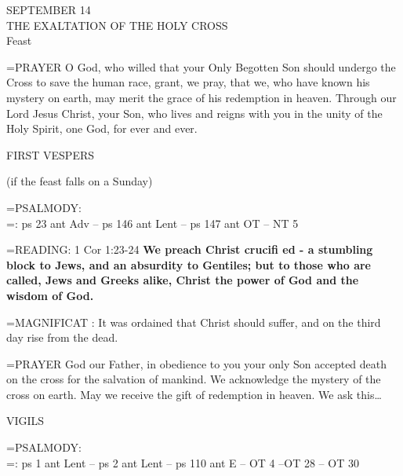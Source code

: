 \begin{center}\normalsize SEPTEMBER 14\\
\footnotesize THE EXALTATION OF THE HOLY CROSS\\
\footnotesize Feast\\
\end{center}

\hangindent=\parindent \small{PRAYER 
O God, who willed that your Only Begotten Son
should undergo the Cross to save the human race,
grant, we pray,
that we, who have known his mystery on earth,
may merit the grace of his redemption in heaven.
Through our Lord Jesus Christ, your Son,
who lives and reigns with you in the unity of the Holy Spirit,
one God, for ever and ever.\\}
 
\begin{flushleft}\normalsize FIRST VESPERS\\\end{flushleft} (if the feast falls on a Sunday)

\hangindent=\parindent \small{PSALMODY:}\\
\hangindent=\parindent : ps 23 ant Adv -- ps 146 ant Lent -- ps 147 ant OT -- NT 5\vspace{0.5em}

\hangindent=\parindent \small{READING}: 1 Cor 1:23-24 \textbf{We preach Christ crucifi ed - a stumbling block
to Jews, and an absurdity to Gentiles; but to those who are called,
Jews and Greeks alike, Christ the power of God and the wisdom of God.\\}
 
\hangindent=\parindent \small{MAGNIFICAT : It was ordained that Christ should suffer, and on the third
day rise from the dead.\\}
 
\hangindent=\parindent \small{PRAYER  God our Father, in obedience to you your only Son accepted
death on the cross for the salvation of mankind. We acknowledge the
mystery of the cross on earth. May we receive the gift of redemption
in heaven. We ask this…\\}
 
\begin{flushleft}\normalsize VIGILS\\\end{flushleft}

\hangindent=\parindent \small{PSALMODY:}\\
\hangindent=\parindent : ps 1 ant Lent -- ps 2 ant Lent -- ps 110 ant E -- OT 4 --OT 28 -- OT 30\vspace{0.5em}

